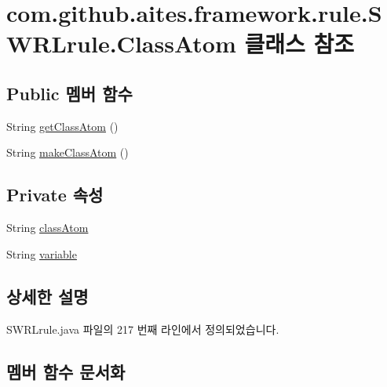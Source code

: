 \hypertarget{classcom_1_1github_1_1aites_1_1framework_1_1rule_1_1_s_w_r_lrule_1_1_class_atom}{}\section{com.\+github.\+aites.\+framework.\+rule.\+S\+W\+R\+Lrule.\+Class\+Atom 클래스 참조}
\label{classcom_1_1github_1_1aites_1_1framework_1_1rule_1_1_s_w_r_lrule_1_1_class_atom}
\subsection*{Public 멤버 함수}
\begin{DoxyCompactItemize}
\item 
String \mbox{\hyperlink{classcom_1_1github_1_1aites_1_1framework_1_1rule_1_1_s_w_r_lrule_1_1_class_atom_a34c7394242bf3412e55e7ae3868d2994}{get\+Class\+Atom}} ()
\item 
String \mbox{\hyperlink{classcom_1_1github_1_1aites_1_1framework_1_1rule_1_1_s_w_r_lrule_1_1_class_atom_a2eb6b4aa3b5bc678c09da10eae2b9ee7}{make\+Class\+Atom}} ()
\end{DoxyCompactItemize}
\subsection*{Private 속성}
\begin{DoxyCompactItemize}
\item 
String \mbox{\hyperlink{classcom_1_1github_1_1aites_1_1framework_1_1rule_1_1_s_w_r_lrule_1_1_class_atom_a6735d699f58d97538b7a95e13a9e9584}{class\+Atom}}
\item 
String \mbox{\hyperlink{classcom_1_1github_1_1aites_1_1framework_1_1rule_1_1_s_w_r_lrule_1_1_class_atom_a62cc90c658adacfcc945bf96a0748c2c}{variable}}
\end{DoxyCompactItemize}


\subsection{상세한 설명}


S\+W\+R\+Lrule.\+java 파일의 217 번째 라인에서 정의되었습니다.



\subsection{멤버 함수 문서화}
\mbox{\label{classcom_1_1github_1_1aites_1_1framework_1_1rule_1_1_s_w_r_lrule_1_1_class_atom_a34c7394242bf3412e55e7ae3868d2994}} 
